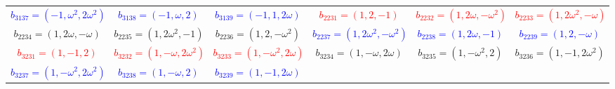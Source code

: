 \documentclass[%
  reprint,
  superscriptaddress,
  showpacs,
  showkeys,
  amsmath,amssymb,
  pra,
  longbibliography,
  floatfix,
  x11names
]{revtex4-2}
\begin{document}
\begin{table}[htbp!]
\begin{ruledtabular}
\begin{tabular}{*{6}{c}}
\textcolor{blue}{$b_{3137}=(-1,\omega^2,2\omega^2)$} & \textcolor{blue}{$b_{3138}=(-1,\omega,2)$} & \textcolor{blue}{$b_{3139}=(-1,1,2\omega)$} & \textcolor{red}{$b_{2231}=(1,2,-1)$} & \textcolor{red}{$b_{2232}=(1,2\omega,-\omega^2)$} & \textcolor{red}{$b_{2233}=(1,2\omega^2,-\omega)$} \\
\textcolor{green!40!black}{$b_{2234}=(1,2\omega,-\omega)$} & \textcolor{green!40!black}{$b_{2235}=(1,2\omega^2,-1)$} & \textcolor{green!40!black}{$b_{2236}=(1,2,-\omega^2)$} & \textcolor{blue}{$b_{2237}=(1,2\omega^2,-\omega^2)$} & \textcolor{blue}{$b_{2238}=(1,2\omega,-1)$} & \textcolor{blue}{$b_{2239}=(1,2,-\omega)$} \\
\textcolor{red}{$b_{3231}=(1,-1,2)$} & \textcolor{red}{$b_{3232}=(1,-\omega,2\omega^2)$} & \textcolor{red}{$b_{3233}=(1,-\omega^2,2\omega)$} & \textcolor{green!40!black}{$b_{3234}=(1,-\omega,2\omega)$} & \textcolor{green!40!black}{$b_{3235}=(1,-\omega^2,2)$} & \textcolor{green!40!black}{$b_{3236}=(1,-1,2\omega^2)$} \\
\textcolor{blue}{$b_{3237}=(1,-\omega^2,2\omega^2)$} & \textcolor{blue}{$b_{3238}=(1,-\omega,2)$} & \textcolor{blue}{$b_{3239}=(1,-1,2\omega)$} & & & \\
\end{tabular}
\end{ruledtabular}
\end{table}
\end{document}
